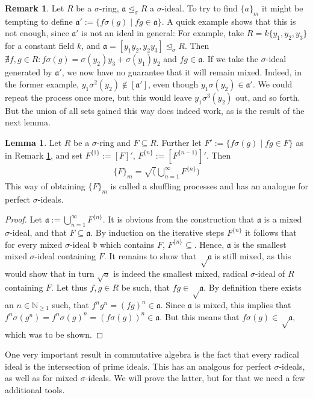 \documentclass[12pt,a4paper,BCOR15mm,twoside,DIV12]{article}
\def\NE{\mathbb{N}_{\geq1}}
\def\a{\mathfrak{a}}
\def\b{\mathfrak{b}}
\def\s{\sigma}
\def\si{\unlhd_{\sigma}}
\theoremstyle{definition}
\newtheorem{rem}[Satz]{Remark}
\newtheorem{lem}[Satz]{Lemma}
\begin{document}
\begin{rem}\label{remshuffling}
Let $R$ be a $\s$-ring, $\a \si R$ a $\s$-ideal. To try to find $\{a\}_m$ it might be tempting to define $\a':= \{ f\s(g) \mid fg \in \a \}$. A quick example shows that this is not enough, since $\a'$ is not an ideal in general: 
For example, take $R=k\{y_1,y_2,y_3\}$ for a constant field $k$, and $\a = [y_1y_2, y_2y_3] \si R$. Then $\nexists f,g \in R: f \s(g) = \s(y_2)y_3 + \s(y_1)y_2$ and $fg \in \a$. 
If we take the $\s$-ideal generated by $\a'$, we now have no guarantee that it will remain mixed. Indeed, in the former example, $y_1\s^2(y_2) \notin [\a']$, even though $y_1 \s(y_2) \in \a'$. We could repeat the process once more,
 but this would leave $y_1 \s^3(y_2)$ out, and so forth. But the union of all sets gained this way does indeed work, as is the result of the next lemma.
\end{rem}

\begin{lem}
Let $R$ be a $\s$-ring and $F \subseteq R$. Further let $F' := \{f\s(g) \mid fg \in F \}$ as in Remark \ref{remshuffling}, and set $F^{\{1\}}:= [F]'$, $F^{\{n\}}:= [F^{\{n-1\}}]'$. Then
\begin{align} \{F\}_m = \sqrt(\bigcup_{n=1}^{\infty} F^{\{n\}}) \end{align}
This way of obtaining $\{F\}_m$ is called a shuffling processes and has an analogue for perfect $\s$-ideals.
\begin{proof}
Let $\a:= \bigcup_{n=1}^{\infty} F^{\{n\}}$. It is obvious from the construction that $\a$ is a mixed $\s$-ideal, and that $F \subseteq \a$. 
By induction on the iterative steps $F^{\{n\}}$ it follows that for every mixed $\s$-ideal $\b$ which contains $F$, $F^{\{n\}} \subseteq$. Hence, $\a$ is the smallest mixed $\s$-ideal containing $F$.
It remains to show that $\sqrt \a$ is still mixed, as this would show that in turn $\sqrt a$ is indeed the smallest mixed, radical $\s$-ideal of $R$ containing $F$. Let thus $f,g \in R$ be such,
that $fg \in \sqrt \a$. By definition there exists an $n \in \NE$ such, that $f^n g^n = (fg)^n \in \a$. Since $\a$ is mixed, this implies that $f^n \s(g^n) = f^n \s(g)^n = (f\s(g))^n \in \a$. 
But this means that $f\s(g) \in \sqrt \a$, which was to be shown.
\end{proof}
\end{lem}

One very important result in commutative algebra is the fact that every radical ideal is the intersection of prime ideals. This has an analgous for perfect $\s$-ideals, as well as for mixed $\s$-ideals. 
We will prove the latter, but for that we need a few additional tools.
\end{document}
